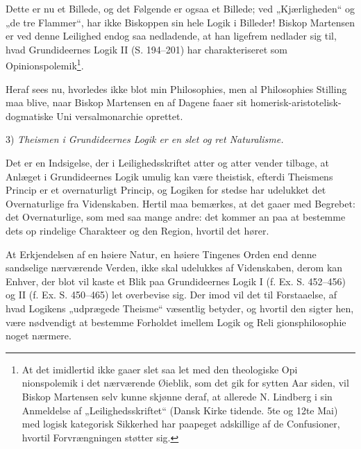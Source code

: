 \documentclass[12pt]{book}
\newcommand{\opage}[1]{\marginnote{\footnotesize\textit{[#1]}}}
\begin{document}
Dette er nu et Billede, og det Følgende er ogsaa et
Billede; ved „Kjærligheden“ og „de tre Flammer“, har ikke
Biskoppen sin hele Logik i Billeder! Biskop Martensen er
ved denne Leilighed endog saa nedladende, at han ligefrem
nedlader sig til, hvad Grundideernes Logik II (S. 194--201)
har charakteriseret som Opinionspolemik\footnote{At det imidlertid ikke gaaer slet saa let med den theologiske Opi\-%
nionspolemik i det nærværende Øieblik, som det gik for sytten Aar
siden, vil Biskop Martensen selv kunne skjønne deraf, at allerede
N. Lindberg i sin Anmeldelse af „Leilighedsskriftet“ (Dansk Kirke\-%
tidende. 5te og 12te Mai) med logisk kategorisk Sikkerhed har
paapeget adskillige af de Confusioner, hvortil Forvrængningen
støtter sig.}.

\opage{133}\setcounter{footnote}{0}%
Heraf sees nu, hvorledes ikke blot min Philosophies, men
al Philosophies Stilling maa blive, naar Biskop Martensen
en af Dagene faaer sit homerisk-aristotelisk-dogmatiske Uni\-%
versalmonarchie oprettet.

3) \emph{Theismen i Grundideernes Logik er en
slet og ret Naturalisme.}%

Det er en Indsigelse, der i Leilighedsskriftet atter og
atter vender tilbage, at Anlæget i Grundideernes Logik
umulig kan være theistisk, efterdi Theismens Princip er et
overnaturligt Princip, og Logiken for stedse har udelukket det
Overnaturlige fra Videnskaben. Hertil maa bemærkes, at
det gaaer med Begrebet: det Overnaturlige, som med saa\-%
mange andre: det kommer an paa at bestemme dets op\-%
rindelige Charakteer og den Region, hvortil det hører.

At Erkjendelsen af en høiere Natur, en høiere Tingenes
Orden end denne sandselige nærværende Verden, ikke skal
udelukkes af Videnskaben, derom kan Enhver, der blot vil
kaste et Blik paa Grundideernes Logik I (f. Ex. S. 452--456)
og II (f. Ex. S. 450--465) let overbevise sig. Der\-%
imod vil det til Forstaaelse, af hvad Logikens „udprægede
Theisme“ væsentlig betyder, og hvortil den sigter hen, være
nødvendigt at bestemme Forholdet imellem Logik og Reli\-%
gionsphilosophie noget nærmere.
\end{document}
